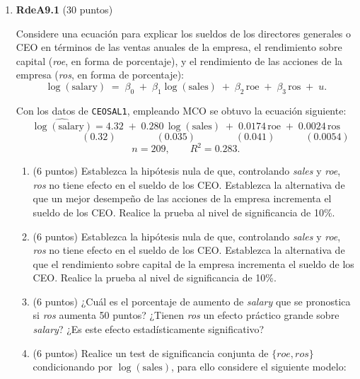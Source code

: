 \documentclass[10pt,a4paper]{article}
\begin{document}
\begin{enumerate}
\begin{enumerate}
{    \textbf{Cálculo de $R^2$ (4 puntos):}
    \[
    R^2 = \frac{SSE}{SST} = \frac{427.2}{450} = 0.949333\ldots
    \]
    \[
    \boxed{R^2 \approx 0.9493.}
    \]
    
    \textbf{Interpretación (1 punto):} El modelo explica aproximadamente el $94.9\%$ de la variabilidad total de $Y$. 
}
\end{enumerate}

    
 \item \textbf{RdeA9.1} (30 puntos) 
 
 Considere una ecuación para explicar los sueldos de los directores generales o CEO en términos de las ventas anuales de la empresa, el rendimiento sobre capital (\emph{roe}, en forma de porcentaje), y el rendimiento de las acciones de la empresa (\emph{ros}, en forma de porcentaje):
\[
\log(\text{salary}) \;=\; \beta_0 \;+\; \beta_1 \log(\text{sales}) \;+\; \beta_2 \,\text{roe} \;+\; \beta_3 \,\text{ros} \;+\; u.
\]


 Con los datos de \texttt{CEOSAL1}, empleando MCO se obtuvo la ecuación siguiente:
\[
\widehat{\log(\text{salary})}
= 4.32 \;+\; 0.280\,\log(\text{sales}) \;+\; 0.0174\,\text{roe} \;+\; 0.0024\,\text{ros}
\]
\[
\qquad\qquad \qquad(0.32)\qquad \qquad(0.035)\qquad\qquad(0.041)\qquad\quad (0.0054)
\]
\[
n = 209,\qquad R^2 = 0.283.
\]

\begin{enumerate}
\item (6 puntos) Establezca la hipótesis nula de que, controlando \textit{sales} y \textit{roe}, \textit{ros} no tiene efecto en el sueldo de los CEO. Establezca la alternativa de que un mejor desempeño de las acciones de la empresa incrementa el sueldo de los CEO.  Realice la prueba al nivel de significancia de 10\%.

\item (6 puntos) Establezca la hipótesis nula de que, controlando \textit{sales} y \textit{roe}, \textit{ros} no tiene efecto en el sueldo de los CEO.  Establezca la alternativa de que el rendimiento sobre capital de la
empresa incrementa el sueldo de los CEO. Realice la prueba al nivel de significancia de 10\%.

\item (6 puntos) ¿Cuál es el porcentaje de aumento de \textit{salary} que se pronostica si \textit{ros} aumenta 50 puntos? ¿Tienen \textit{ros} un efecto práctico grande sobre \textit{salary}? ¿Es este efecto estadísticamente significativo?

\item (6 puntos)  Realice un {test} de {significancia conjunta} de \(\{\textit{roe},\textit{ros}\}\) condicionando por \(\log(\text{sales})\), para ello considere el siguiente modelo: 



\end{enumerate}
\end{enumerate}
\end{document}
